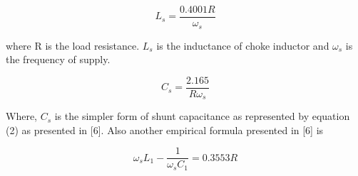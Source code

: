 \documentclass[journal,twoside]{IEEEtran}
\begin{document}
\begin{equation}
L_s=\frac{0.4001R}{\omega _s}
\end{equation}


\bigskip
where R is the load resistance. $L_s$ is the inductance of choke
inductor and $\omega _s$ is the frequency of supply.

\begin{equation}
C_s=\frac{2.165}{R\omega _s}
\end{equation}

\bigskip
Where, $C_s$ is the simpler form of shunt capacitance as
represented by equation (2) as presented in [6]. Also another
empirical formula presented in [6] is

\begin{equation}
\omega _sL_1-\frac{1}{\omega _sC_1}=0.3553R
\end{equation}


\bigskip
\end{document}
